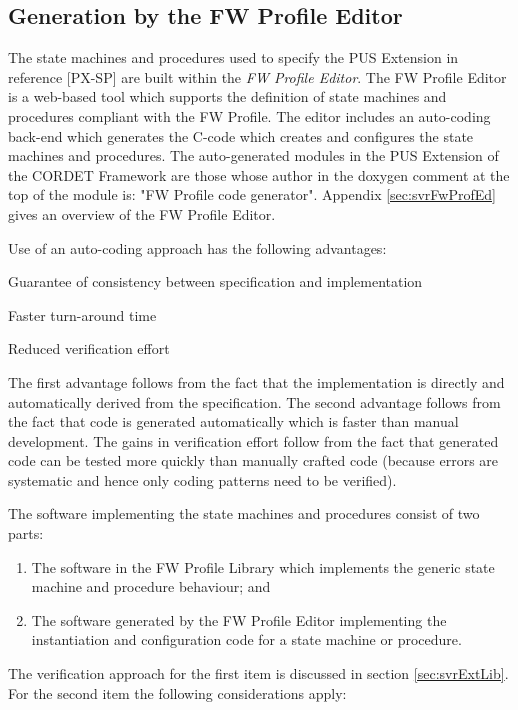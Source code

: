 \documentclass{pnp_article}
\begin{document}
\subsection{Generation by the FW Profile Editor}
The state machines and procedures used to specify the PUS Extension in reference [PX-SP] are built within the \textit{FW Profile Editor}. The FW Profile Editor is a web-based tool which supports the definition of state machines and procedures compliant with the FW Profile. The editor includes an auto-coding back-end which generates the C-code which creates and configures the state machines and procedures. The auto-generated modules in the PUS Extension of the CORDET Framework are those whose author in the doxygen comment at the top of the module is: "FW Profile code generator". Appendix \ref{sec:svrFwProfEd} gives an overview of the FW Profile Editor.

Use of an auto-coding approach has the following advantages:

\begin{fw_itemize}
\item Guarantee of consistency between specification and implementation 
\item Faster turn-around time 
\item Reduced verification effort 
\end{fw_itemize}

The first advantage follows from the fact that the implementation is directly and automatically derived from the specification. The second advantage follows from the fact that code is generated automatically which is faster than manual development. The gains in verification effort follow from the fact that generated code can be tested more quickly than manually crafted code (because errors are systematic and hence only coding patterns need to be verified). 

The software implementing the state machines and procedures consist of two parts:

\begin{enumerate}
\item The software in the FW Profile Library which implements the generic state machine and procedure behaviour; and
\item The software generated by the FW Profile Editor implementing the instantiation and configuration code for a state machine or procedure.
\end{enumerate}

The verification approach for the first item is discussed in section \ref{sec:svrExtLib}. For the second item the following considerations apply:
\end{document}
